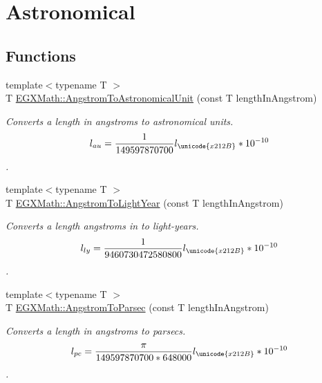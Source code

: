 \hypertarget{group___e_g_x_math-_conversions-_length_conversions-_non-_s_i-_angstrom-_astronomical}{}\section{Astronomical}
\label{group___e_g_x_math-_conversions-_length_conversions-_non-_s_i-_angstrom-_astronomical}
\subsection*{Functions}
\begin{DoxyCompactItemize}
\item 
{\footnotesize template$<$typename T $>$ }\\T \mbox{\hyperlink{group___e_g_x_math-_conversions-_length_conversions-_non-_s_i-_angstrom-_astronomical_ga3e524fe9f8c68c596264d4745b993be8}{E\+G\+X\+Math\+::\+Angstrom\+To\+Astronomical\+Unit}} (const T length\+In\+Angstrom)
\begin{DoxyCompactList}\small\item\em Converts a length in angstroms to astronomical units. \[ l_{au}= \frac{1}{149597870700} l_{\unicode{x212B}} * 10^{-10} \]. \end{DoxyCompactList}\item 
{\footnotesize template$<$typename T $>$ }\\T \mbox{\hyperlink{group___e_g_x_math-_conversions-_length_conversions-_non-_s_i-_angstrom-_astronomical_ga3ab9080fa3beaf5bbc5ea60323ff3634}{E\+G\+X\+Math\+::\+Angstrom\+To\+Light\+Year}} (const T length\+In\+Angstrom)
\begin{DoxyCompactList}\small\item\em Converts a length angstroms in to light-\/years. \[ l_{ly}= \frac{1}{9460730472580800} l_{\unicode{x212B}} * 10^{-10} \]. \end{DoxyCompactList}\item 
{\footnotesize template$<$typename T $>$ }\\T \mbox{\hyperlink{group___e_g_x_math-_conversions-_length_conversions-_non-_s_i-_angstrom-_astronomical_ga590d77221fd449be2e65f24f8d14a6d5}{E\+G\+X\+Math\+::\+Angstrom\+To\+Parsec}} (const T length\+In\+Angstrom)
\begin{DoxyCompactList}\small\item\em Converts a length in angstroms to parsecs. \[ l_{pc}=\frac{\pi}{149597870700 * 648000} l_{\unicode{x212B}} * 10^{-10} \]. \end{DoxyCompactList}\end{DoxyCompactItemize}


